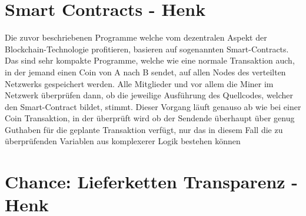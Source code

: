 \section{Smart Contracts - Henk }
Die zuvor beschriebenen Programme welche vom dezentralen Aspekt der Blockchain-Technologie profitieren, basieren auf sogenannten Smart-Contracts. Das sind sehr kompakte Programme, welche wie eine normale Transaktion auch, in der jemand einen Coin von A nach B sendet, auf allen Nodes des verteilten Netzwerks gespeichert werden. Alle Mitglieder und vor allem die Miner im Netzwerk überprüfen dann, ob die jeweilige Ausführung des Quellcodes, welcher den Smart-Contract bildet, stimmt. Dieser Vorgang läuft genauso ab wie bei einer Coin Transaktion, in der überprüft wird ob der Sendende überhaupt über genug Guthaben für die geplante Transaktion verfügt, nur das in diesem Fall die zu überprüfenden Variablen aus komplexerer Logik bestehen können
\section{Chance: Lieferketten Transparenz - Henk}

